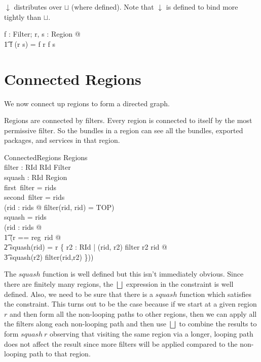 \documentclass[a4paper,9pt]{article}
\begin{document}
$\downarrow$ distributes over $\sqcup$ (where defined). Note that $\downarrow$ is defined to bind
more tightly than $\sqcup$.
\begin{argue}
  \shows \forall f : Filter; r, s : Region @ \\
\t1 f \downarrow (r \sqcup s) = f \downarrow r \sqcup f \downarrow s \\
\end{argue}

\clearpage
\section{Connected Regions}
\label{cha:connregions}

We now connect up regions to form a directed graph.

Regions are connected by filters.
Every region is connected to itself by the most permissive filter.
So the bundles in a region can see all the bundles, exported packages, and services in that region.
\begin{schema}{ConnectedRegions}
  Regions \\
  filter : RId \cross RId \pfun Filter \\
  squash : RId \pfun Region \\
\where
  first~\limg \dom filter \rimg = rids \\
  second~\limg \dom filter \rimg = rids \\
  (\forall rid : rids @ filter(rid, rid) = TOP) \\
  \dom squash = rids \\
  (\forall rid : rids @ \\
\t1 (\LET r == reg~rid @ \\
\t2 squash(rid) = r \sqcup \bigsqcup \{ r2 : RId | (rid, r2) \in \dom filter \land r2 \neq rid @ \\
\t3 squash(r2) \downarrow filter(rid,r2) \}))\\
\end{schema}

The $squash$ function is well defined but this isn't immediately obvious.
Since there are finitely many regions, the $\bigsqcup$ expression in the constraint is well defined.
Also, we need to be sure that there is a $squash$ function which satisfies the constraint.
This turns out to be the case because if we start at a given region $r$ and then form all the non-looping
paths to other regions, then we can apply all the filters along each non-looping path and then
use $\bigsqcup$ to combine the results to form $squash~r$ observing that visiting the same region via
a longer, looping path does not affect the result since more filters will
be applied compared to the non-looping path to that region.
\end{document}
